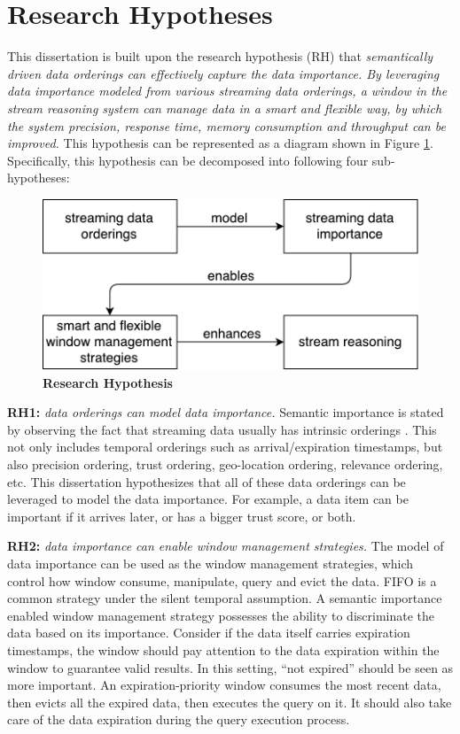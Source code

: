 \section{Research Hypotheses}
This dissertation is built upon the research hypothesis (RH) that \textit{semantically driven data orderings can effectively capture the data importance. By leveraging data importance modeled from various streaming data orderings, a window in the stream reasoning system can manage data in a smart and flexible way, by which the system precision, response time, memory consumption and throughput can be improved.}
This hypothesis can be represented as a diagram shown in Figure \ref{fig:1-rh}.
Specifically, this hypothesis can be decomposed into following four sub-hypotheses:

\begin{figure}[!htbp]
	\centering
	\includegraphics[width=5in]{img/1-rh.pdf}
	\caption{\textbf{Research Hypothesis}}
	\label{fig:1-rh} 
\end{figure}

\textbf{RH1:} \textit{data orderings can model data importance.}
Semantic importance is stated by observing the fact that streaming data usually has intrinsic orderings \cite{della2013order}. 
This not only includes temporal orderings such as arrival/expiration timestamps, but also precision ordering, trust ordering, geo-location ordering, relevance ordering, etc. 
This dissertation hypothesizes that all of these data orderings can be leveraged to model the data importance. 
For example, a data item can be important if it arrives later, or has a bigger trust score, or both. 

\textbf{RH2:} \textit{data importance can enable window management strategies.}
The model of data importance can be used as the window management strategies, which control how window consume, manipulate, query and evict the data.
FIFO is a common strategy under the silent temporal assumption. 
A semantic importance enabled window management strategy possesses the ability to discriminate the data based on its importance. 
Consider if the data itself carries expiration timestamps, the window should pay attention to the data expiration within the window to guarantee valid results.
In this setting, ``not expired'' should be seen as more important. 
An expiration-priority window consumes the most recent data, then evicts all the expired data, then executes the query on it. 
It should also take care of the data expiration during the query execution process. 

